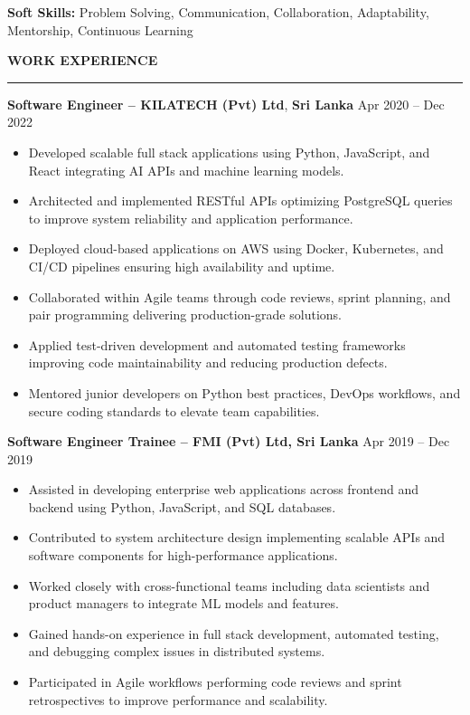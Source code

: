\documentclass[10pt,letterpaper]{article}
\begin{document}
\textbf{Soft Skills:} Problem Solving, Communication, Collaboration, Adaptability, Mentorship, Continuous Learning

\vspace{8pt}

\textbf{WORK EXPERIENCE}\\[-8pt]
\noindent\rule{\textwidth}{1pt}

\vspace{-2pt}

\textbf{Software Engineer -- KILATECH (Pvt) Ltd}, \textbf{Sri Lanka} \hfill Apr 2020 -- Dec 2022

\vspace{-1pt}

\begin{itemize}
\item Developed scalable full stack applications using Python, JavaScript, and React integrating AI APIs and machine learning models.
\item Architected and implemented RESTful APIs optimizing PostgreSQL queries to improve system reliability and application performance.
\item Deployed cloud-based applications on AWS using Docker, Kubernetes, and CI/CD pipelines ensuring high availability and uptime.
\item Collaborated within Agile teams through code reviews, sprint planning, and pair programming delivering production-grade solutions.
\item Applied test-driven development and automated testing frameworks improving code maintainability and reducing production defects.
\item Mentored junior developers on Python best practices, DevOps workflows, and secure coding standards to elevate team capabilities.
\end{itemize}

\textbf{Software Engineer Trainee -- FMI (Pvt) Ltd, Sri Lanka} \hfill Apr 2019 -- Dec 2019

\vspace{-1pt}

\begin{itemize}
\item Assisted in developing enterprise web applications across frontend and backend using Python, JavaScript, and SQL databases.
\item Contributed to system architecture design implementing scalable APIs and software components for high-performance applications.
\item Worked closely with cross-functional teams including data scientists and product managers to integrate ML models and features.
\item Gained hands-on experience in full stack development, automated testing, and debugging complex issues in distributed systems.
\item Participated in Agile workflows performing code reviews and sprint retrospectives to improve performance and scalability.
\end{itemize}
\end{document}
